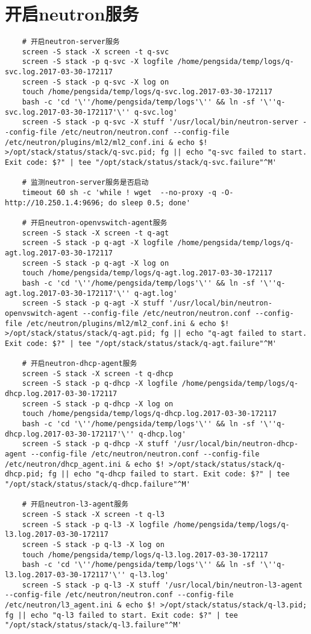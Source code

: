 \documentclass[a4paper,left=1.5cm,right=1.5cm,11pt]{article}
\begin{document}
\section{开启neutron服务}
	\begin{lstlisting}
	# 开启neutron-server服务
	screen -S stack -X screen -t q-svc
	screen -S stack -p q-svc -X logfile /home/pengsida/temp/logs/q-svc.log.2017-03-30-172117
    screen -S stack -p q-svc -X log on
	touch /home/pengsida/temp/logs/q-svc.log.2017-03-30-172117
    bash -c 'cd '\''/home/pengsida/temp/logs'\'' && ln -sf '\''q-svc.log.2017-03-30-172117'\'' q-svc.log'
	screen -S stack -p q-svc -X stuff '/usr/local/bin/neutron-server --config-file /etc/neutron/neutron.conf --config-file /etc/neutron/plugins/ml2/ml2_conf.ini & echo $! >/opt/stack/status/stack/q-svc.pid; fg || echo "q-svc failed to start. Exit code: $?" | tee "/opt/stack/status/stack/q-svc.failure"^M'

	# 监测neutron-server服务是否启动
	timeout 60 sh -c 'while ! wget  --no-proxy -q -O- http://10.250.1.4:9696; do sleep 0.5; done'

	# 开启neutron-openvswitch-agent服务
	screen -S stack -X screen -t q-agt
	screen -S stack -p q-agt -X logfile /home/pengsida/temp/logs/q-agt.log.2017-03-30-172117
    screen -S stack -p q-agt -X log on
	touch /home/pengsida/temp/logs/q-agt.log.2017-03-30-172117
    bash -c 'cd '\''/home/pengsida/temp/logs'\'' && ln -sf '\''q-agt.log.2017-03-30-172117'\'' q-agt.log'
	screen -S stack -p q-agt -X stuff '/usr/local/bin/neutron-openvswitch-agent --config-file /etc/neutron/neutron.conf --config-file /etc/neutron/plugins/ml2/ml2_conf.ini & echo $! >/opt/stack/status/stack/q-agt.pid; fg || echo "q-agt failed to start. Exit code: $?" | tee "/opt/stack/status/stack/q-agt.failure"^M'

	# 开启neutron-dhcp-agent服务
	screen -S stack -X screen -t q-dhcp
	screen -S stack -p q-dhcp -X logfile /home/pengsida/temp/logs/q-dhcp.log.2017-03-30-172117
    screen -S stack -p q-dhcp -X log on
	touch /home/pengsida/temp/logs/q-dhcp.log.2017-03-30-172117
    bash -c 'cd '\''/home/pengsida/temp/logs'\'' && ln -sf '\''q-dhcp.log.2017-03-30-172117'\'' q-dhcp.log'
	screen -S stack -p q-dhcp -X stuff '/usr/local/bin/neutron-dhcp-agent --config-file /etc/neutron/neutron.conf --config-file /etc/neutron/dhcp_agent.ini & echo $! >/opt/stack/status/stack/q-dhcp.pid; fg || echo "q-dhcp failed to start. Exit code: $?" | tee "/opt/stack/status/stack/q-dhcp.failure"^M'

	# 开启neutron-l3-agent服务
	screen -S stack -X screen -t q-l3
	screen -S stack -p q-l3 -X logfile /home/pengsida/temp/logs/q-l3.log.2017-03-30-172117
    screen -S stack -p q-l3 -X log on
	touch /home/pengsida/temp/logs/q-l3.log.2017-03-30-172117
    bash -c 'cd '\''/home/pengsida/temp/logs'\'' && ln -sf '\''q-l3.log.2017-03-30-172117'\'' q-l3.log'
	screen -S stack -p q-l3 -X stuff '/usr/local/bin/neutron-l3-agent --config-file /etc/neutron/neutron.conf --config-file /etc/neutron/l3_agent.ini & echo $! >/opt/stack/status/stack/q-l3.pid; fg || echo "q-l3 failed to start. Exit code: $?" | tee "/opt/stack/status/stack/q-l3.failure"^M'


\end{lstlisting}
\end{document}
